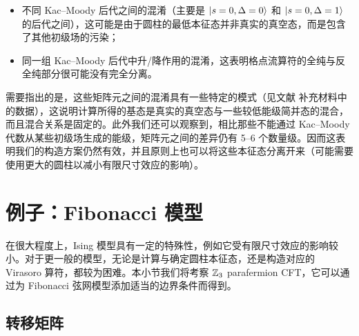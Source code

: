 \begin{itemize}
  \item 不同 Kac--Moody 后代之间的混淆（主要是 $\ket{s=0,\Delta=0}$ 和 $\ket{s=0,\Delta=1}$ 的后代之间），这可能是由于圆柱的最低本征态并非真实的真空态，而是包含了其他初级场的污染；
  \item 同一组 Kac--Moody 后代中升/降作用的混淆，这表明格点流算符的全纯与反全纯部分很可能没有完全分离。
\end{itemize}

需要指出的是，这些矩阵元之间的混淆具有一些特定的模式（见文献 \parencite{wang2022virasoro} 补充材料中的数据），这说明计算所得的基态是真实的真空态与一些较低能级简并态的混合，而且混合关系是固定的。此外我们还可以观察到，相比那些不能通过 Kac--Moody 代数从某些初级场生成的能级，矩阵元之间的差异仍有 5--6 个数量级。因而这表明我们的构造方案仍然有效，并且原则上也可以将这些本征态分离开来（可能需要使用更大的圆柱以减小有限尺寸效应的影响）。

\section{例子：Fibonacci 模型}

在很大程度上，Ising 模型具有一定的特殊性，例如它受有限尺寸效应的影响较小。对于更一般的模型，无论是计算与确定圆柱本征态，还是构造对应的 Virasoro 算符，都较为困难。本小节我们将考察 $\mathbb{Z}_3$ parafermion CFT，它可以通过为 Fibonacci 弦网模型添加适当的边界条件而得到。

\subsection{转移矩阵}


